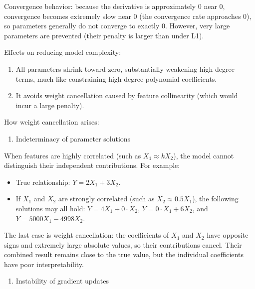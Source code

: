 Convergence behavior: because the derivative is approximately 0 near 0, convergence becomes extremely slow near 0 (the convergence rate approaches 0), so parameters generally do not converge to exactly 0. However, very large parameters are prevented (their penalty is larger than under L1).

Effects on reducing model complexity:

\begin{enumerate}
\def\labelenumi{(\arabic{enumi})}
\item
  All parameters shrink toward zero, substantially weakening high-degree terms, much like constraining high-degree polynomial coefficients.
\item
  It avoids weight cancellation caused by feature collinearity (which would incur a large penalty).
\end{enumerate}

How weight cancellation arises:

\begin{enumerate}
\def\labelenumi{\arabic{enumi}.}
\tightlist
\item
  Indeterminacy of parameter solutions
\end{enumerate}

When features are highly correlated (such as \(X_1\approx kX_2\)), the model cannot distinguish their independent contributions. For example:

\begin{itemize}
\tightlist
\item
  True relationship: \(Y=2X_1+3X_2\).
\item
  If \(X_1\) and \(X_2\) are strongly correlated (such as \(X_2\approx 0.5X_1\)), the following solutions may all hold: \(Y=4X_1+0\cdot X_2\), \(Y=0\cdot X_1+6X_2\), and \(Y=5000X_1-4998X_2\).
\end{itemize}

The last case is weight cancellation: the coefficients of \(X_1\) and \(X_2\) have opposite signs and extremely large absolute values, so their contributions cancel. Their combined result remains close to the true value, but the individual coefficients have poor interpretability.

\begin{enumerate}
\def\labelenumi{\arabic{enumi}.}
\setcounter{enumi}{1}
\tightlist
\item
  Instability of gradient updates
\end{enumerate}


